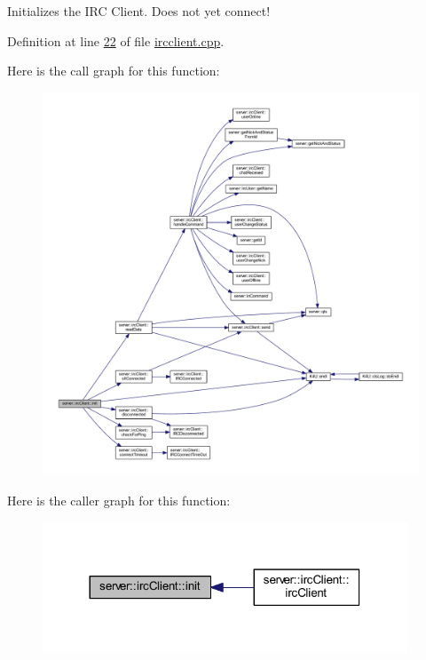Initializes the I\-R\-C Client. Does not yet connect! 



Definition at line \hyperlink{ircclient_8cpp_source_l00022}{22} of file \hyperlink{ircclient_8cpp_source}{ircclient.\-cpp}.



Here is the call graph for this function\-:\nopagebreak
\begin{figure}[H]
\begin{center}
\leavevmode
\includegraphics[width=350pt]{d1/d10/classserver_1_1irc_client_a3991833ddcff72ca94d4c0ec588012ac_cgraph}
\end{center}
\end{figure}




Here is the caller graph for this function\-:
\nopagebreak
\begin{figure}[H]
\begin{center}
\leavevmode
\includegraphics[width=308pt]{d1/d10/classserver_1_1irc_client_a3991833ddcff72ca94d4c0ec588012ac_icgraph}
\end{center}
\end{figure}


